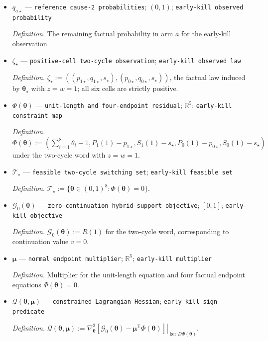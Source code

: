 \documentclass{article}
\begin{document}
\begin{itemize}
  \item \(q_{a\star}\) --- \texttt{reference cause-\allowbreak{}2 probabilities}; \((0,1)\); \texttt{early-\allowbreak{}kill observed probability}
  \par\smallskip\noindent\emph{Definition.} The remaining factual probability in arm \(a\) for the early-kill observation.
  \item \(\zeta_\star\) --- \texttt{positive-\allowbreak{}cell two-\allowbreak{}cycle observation}; \texttt{early-\allowbreak{}kill observed law}
  \par\smallskip\noindent\emph{Definition.} \(\zeta_\star:=((p_{1\star},q_{1\star},s_\star),(p_{0\star},q_{0\star},s_\star))\), the factual law induced by \(\boldsymbol\theta_\star\) with \(z=w=1\); all six cells are strictly positive.
  \item \(\Phi(\boldsymbol\theta)\) --- \texttt{unit-\allowbreak{}length and four-\allowbreak{}endpoint residual}; \(\mathbb R^5\); \texttt{early-\allowbreak{}kill constraint map}
  \par\smallskip\noindent\emph{Definition.} \(\Phi(\boldsymbol\theta):=(\sum_{i=1}^8\theta_i-1,P_1(1)-p_{1\star},S_1(1)-s_\star,P_0(1)-p_{0\star},S_0(1)-s_\star)\) under the two-cycle word with \(z=w=1\).
  \item \(\mathcal T_\star\) --- \texttt{feasible two-\allowbreak{}cycle switching set}; \texttt{early-\allowbreak{}kill feasible set}
  \par\smallskip\noindent\emph{Definition.} \(\mathcal T_\star:=\{\boldsymbol\theta\in(0,1)^8:\Phi(\boldsymbol\theta)=0\}\).
  \item \(\mathcal G_0(\boldsymbol\theta)\) --- \texttt{zero-\allowbreak{}continuation hybrid support objective}; \([0,1]\); \texttt{early-\allowbreak{}kill objective}
  \par\smallskip\noindent\emph{Definition.} \(\mathcal G_0(\boldsymbol\theta):=R(1)\) for the two-cycle word, corresponding to continuation value \(v=0\).
  \item \(\boldsymbol\mu\) --- \texttt{normal endpoint multiplier}; \(\mathbb R^5\); \texttt{early-\allowbreak{}kill multiplier}
  \par\smallskip\noindent\emph{Definition.} Multiplier for the unit-length equation and four factual endpoint equations \(\Phi(\boldsymbol\theta)=0\).
  \item \(\mathscr Q(\boldsymbol\theta,\boldsymbol\mu)\) --- \texttt{constrained Lagrangian Hessian}; \texttt{early-\allowbreak{}kill sign predicate}
  \par\smallskip\noindent\emph{Definition.} \(\mathscr Q(\boldsymbol\theta,\boldsymbol\mu):=\left.\nabla_{\boldsymbol\theta}^2[\mathcal G_0(\boldsymbol\theta)-\boldsymbol\mu^{\mathsf T}\Phi(\boldsymbol\theta)]\right|_{\ker D\Phi(\boldsymbol\theta)}\).

\end{itemize}
\end{document}
